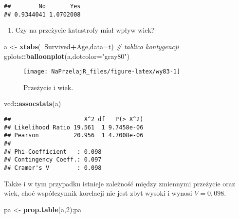 \documentclass[polish,]{book}
\newenvironment{Shaded}{\begin{snugshade}}{\end{snugshade}}
\newcommand{\CommentTok}[1]{\textcolor[rgb]{0.56,0.35,0.01}{\textit{#1}}}
\newcommand{\DataTypeTok}[1]{\textcolor[rgb]{0.13,0.29,0.53}{#1}}
\newcommand{\DecValTok}[1]{\textcolor[rgb]{0.00,0.00,0.81}{#1}}
\newcommand{\KeywordTok}[1]{\textcolor[rgb]{0.13,0.29,0.53}{\textbf{#1}}}
\newcommand{\NormalTok}[1]{#1}
\newcommand{\OperatorTok}[1]{\textcolor[rgb]{0.81,0.36,0.00}{\textbf{#1}}}
\newcommand{\StringTok}[1]{\textcolor[rgb]{0.31,0.60,0.02}{#1}}
\providecommand{\tightlist}{%
  \setlength{\itemsep}{0pt}\setlength{\parskip}{0pt}}
\begin{document}
\begin{verbatim}
##        No       Yes 
## 0.9344041 1.0702008
\end{verbatim}

\begin{enumerate}
\def\labelenumi{\arabic{enumi}.}
\setcounter{enumi}{2}
\tightlist
\item
  Czy na przeżycie katastrofy miał wpływ wiek?
\end{enumerate}

\begin{Shaded}
\begin{Highlighting}[]
\NormalTok{a <-}\StringTok{ }\KeywordTok{xtabs}\NormalTok{(}\OperatorTok{~}\NormalTok{Survived}\OperatorTok{+}\NormalTok{Age,}\DataTypeTok{data=}\NormalTok{t) }\CommentTok{# tablica kontygencji}
\NormalTok{gplots}\OperatorTok{::}\KeywordTok{balloonplot}\NormalTok{(a,}\DataTypeTok{dotcolor=}\StringTok{"gray80"}\NormalTok{)}
\end{Highlighting}
\end{Shaded}

\begin{figure}[h]

{\centering \texttt{[image: NaPrzelajR\_files/figure-latex/wy83-1]} 

}

\caption{Przeżycie i wiek.}\label{fig:wy83}
\end{figure}

\begin{Shaded}
\begin{Highlighting}[]
\NormalTok{vcd}\OperatorTok{::}\KeywordTok{assocstats}\NormalTok{(a)}
\end{Highlighting}
\end{Shaded}

\begin{verbatim}
##                     X^2 df   P(> X^2)
## Likelihood Ratio 19.561  1 9.7458e-06
## Pearson          20.956  1 4.7008e-06
## 
## Phi-Coefficient   : 0.098 
## Contingency Coeff.: 0.097 
## Cramer's V        : 0.098
\end{verbatim}

Także i w tym przypadku istnieje zależność między zmiennymi przeżycie oraz wiek,
choć współczynnik korelacji nie jest zbyt wysoki i wynosi \(V = 0,098\).

\begin{Shaded}
\begin{Highlighting}[]
\NormalTok{pa <-}\StringTok{ }\KeywordTok{prop.table}\NormalTok{(a,}\DecValTok{2}\NormalTok{);pa}
\end{Highlighting}
\end{Shaded}
\end{document}
